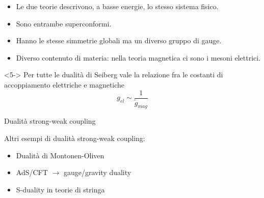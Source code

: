 \documentclass[10pt,compress]{beamer}
\begin{document}
\begin{frame}
	\begin{itemize}
\item<1->	Le due teorie descrivono, a basse energie, lo stesso sistema fisico.\\
\item<2->	Sono entrambe superconformi.
\item <3-> Hanno le stesse simmetrie globali ma un diverso gruppo di gauge.
\item <4->Diverso contenuto di materia: nella teoria magnetica ci sono i mesoni elettrici.
	\end{itemize}
\vspace{0.5cm}
\begin{block}{}<5->
Per tutte le dualità di Seiberg vale la relazione fra le costanti di accoppiamento elettriche e magnetiche
 $$
  g_{el} \sim \frac{1}{\tilde{g}_{mag}} 
$$
\end{block}


\end{frame}




\begin{frame}{Dualità strong-weak coupling}

\vspace{0.5cm}

Altri esempi di dualità strong-weak coupling:
\begin{itemize}
\item Dualità di Montonen-Oliven
\item AdS/CFT $\rightarrow$ gauge/gravity duality 
\item S-duality in teorie di stringa
\end{itemize}

\end{frame}
\end{document}
